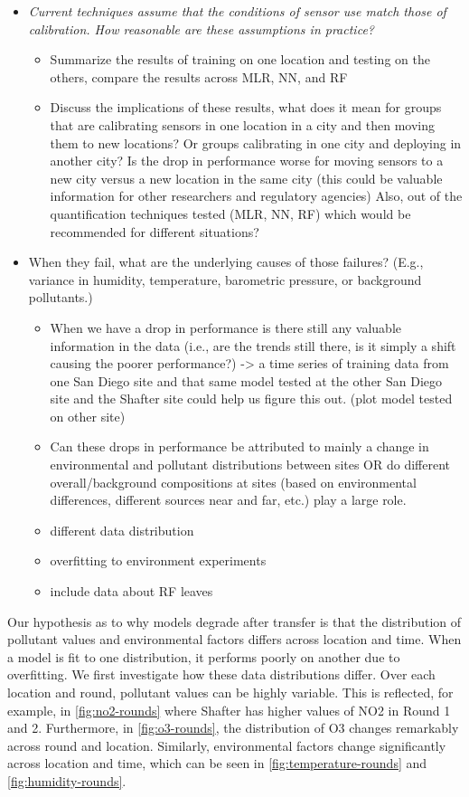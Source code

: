 \documentclass[journal abbreviation, manuscript]{copernicus}
\begin{document}
\begin{itemize}
    \item  \emph{Current techniques assume that the conditions of sensor use match those of calibration.  How reasonable are these assumptions in practice?}
    \begin{itemize}
        \item Summarize the results of training on one location and testing on the others, compare the results across MLR, NN, and RF 
        \item Discuss the implications of these results, what does it mean for groups that are calibrating sensors in one location in a city and then moving them to new locations? Or groups calibrating in one city and deploying in another city? Is the drop in performance worse for moving sensors to a new city versus a new location in the same city (this could be valuable information for other researchers and regulatory agencies) Also, out of the quantification techniques tested (MLR, NN, RF) which would be recommended for different situations?
    \end{itemize}
    \item When they fail, what are the underlying causes of those failures?  (E.g., variance in humidity, temperature, barometric pressure, or background pollutants.)
    \begin{itemize}
        \item When we have a drop in performance is there still any valuable information in the data (i.e., are the trends still there, is it simply a shift causing the poorer performance?) -> a time series of training data from one San Diego site and that same model tested at the other San Diego site and the Shafter site could help us figure this out. (plot model tested on other site)
        \item Can these drops in performance be attributed to mainly a change in environmental and pollutant distributions between sites OR do different overall/background compositions at sites (based on environmental differences, different sources near and far, etc.) play a large role.
        \item different data distribution
        \item overfitting to environment experiments
        \item include data about RF leaves
    \end{itemize}
\end{itemize}

Our hypothesis as to why models degrade after transfer is that the distribution
of pollutant values and environmental factors differs across location and time. When
a model is fit to one distribution, it performs poorly on another due to overfitting.
We first investigate how these data distributions differ. Over each location and round, pollutant values can be highly variable. This is reflected, for example, in \autoref{fig:no2-rounds} where Shafter has higher values of NO2 in Round 1 and 2. Furthermore, in \autoref{fig:o3-rounds}, the distribution of O3 changes remarkably across round and location.
Similarly, environmental factors change significantly across location and time, which can be seen in \autoref{fig:temperature-rounds} and \autoref{fig:humidity-rounds}.
\end{document}

